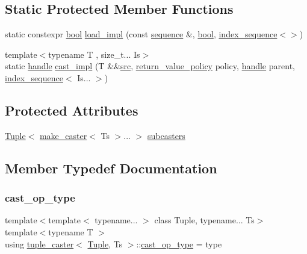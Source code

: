 \subsection*{Static Protected Member Functions}
\begin{DoxyCompactItemize}
\item 
static constexpr \mbox{\hyperlink{asdl_8h_af6a258d8f3ee5206d682d799316314b1}{bool}} \mbox{\hyperlink{classtuple__caster_a69ae2feb001453601165fc693e74584b}{load\+\_\+impl}} (const \mbox{\hyperlink{classsequence}{sequence}} \&, \mbox{\hyperlink{asdl_8h_af6a258d8f3ee5206d682d799316314b1}{bool}}, \mbox{\hyperlink{structindex__sequence}{index\+\_\+sequence}}$<$$>$)
\item 
{\footnotesize template$<$typename T , size\+\_\+t... Is$>$ }\\static \mbox{\hyperlink{classhandle}{handle}} \mbox{\hyperlink{classtuple__caster_a85f19b13b0bfda89d32cdc631b1652c0}{cast\+\_\+impl}} (T \&\&\mbox{\hyperlink{_s_d_l__opengl__glext_8h_a72e0fdf0f845ded60b1fada9e9195cd7}{src}}, \mbox{\hyperlink{detail_2common_8h_adde72ab1fb0dd4b48a5232c349a53841}{return\+\_\+value\+\_\+policy}} policy, \mbox{\hyperlink{classhandle}{handle}} parent, \mbox{\hyperlink{structindex__sequence}{index\+\_\+sequence}}$<$ Is... $>$)
\end{DoxyCompactItemize}
\subsection*{Protected Attributes}
\begin{DoxyCompactItemize}
\item 
\mbox{\hyperlink{_python-ast_8h_a3f332c0be139cb870e516bad9b6a9366}{Tuple}}$<$ \mbox{\hyperlink{cast_8h_ab32b52411a6b07420516d79074815713}{make\+\_\+caster}}$<$ Ts $>$... $>$ \mbox{\hyperlink{classtuple__caster_a5a772e6404951d9cbfdfb9d06d342de1}{subcasters}}
\end{DoxyCompactItemize}


\subsection{Member Typedef Documentation}
\mbox{\label{classtuple__caster_a2f1b288b872b4198d752374cb614b24b}} 
\subsubsection{\texorpdfstring{cast\_op\_type}{cast\_op\_type}}
{\footnotesize\ttfamily template$<$template$<$ typename... $>$ class Tuple, typename... Ts$>$ \\
template$<$typename T $>$ \\
using \mbox{\hyperlink{classtuple__caster}{tuple\+\_\+caster}}$<$ \mbox{\hyperlink{_python-ast_8h_a3f332c0be139cb870e516bad9b6a9366}{Tuple}}, Ts $>$\+::\mbox{\hyperlink{classtuple__caster_a2f1b288b872b4198d752374cb614b24b}{cast\+\_\+op\+\_\+type}} =  type}



